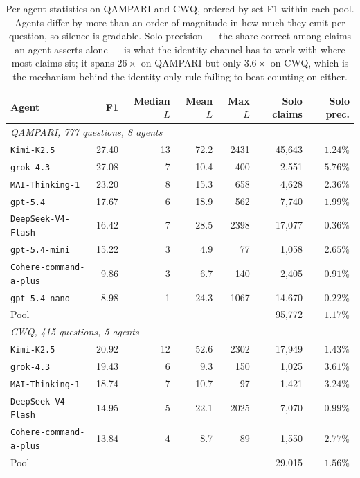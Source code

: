 \documentclass[11pt]{article}
\begin{document}
\begin{table}[t]
  \caption{Per-agent statistics on QAMPARI and CWQ, ordered by set F1 within each pool. Agents differ by more than an order of magnitude in how much they emit per question, so silence is gradable. Solo precision --- the share correct among claims an agent asserts alone --- is what the identity channel has to work with where most claims sit; it spans $26\times$ on QAMPARI but only $3.6\times$ on CWQ, which is the mechanism behind the identity-only rule failing to beat counting on either.}
  \label{tab:lengths}
  \centering
  \begin{tabular}{lrrrrrr}
    \toprule
    Agent & F1 & Median $L$ & Mean $L$ & Max $L$ & Solo claims & Solo prec. \\
    \midrule
    \multicolumn{7}{l}{\emph{QAMPARI, 777 questions, 8 agents}} \\
    \texttt{Kimi-K2.5}             & 27.40 & 13 & 72.2 & 2431 & 45,643 & $1.24\%$ \\
    \texttt{grok-4.3}              & 27.08 &  7 & 10.4 &  400 &  2,551 & $\mathbf{5.76\%}$ \\
    \texttt{MAI-Thinking-1}        & 23.20 &  8 & 15.3 &  658 &  4,628 & $2.36\%$ \\
    \texttt{gpt-5.4}               & 17.67 &  6 & 18.9 &  562 &  7,740 & $1.99\%$ \\
    \texttt{DeepSeek-V4-Flash}     & 16.42 &  7 & 28.5 & 2398 & 17,077 & $0.36\%$ \\
    \texttt{gpt-5.4-mini}          & 15.22 &  3 &  4.9 &   77 &  1,058 & $2.65\%$ \\
    \texttt{Cohere-command-a-plus} &  9.86 &  3 &  6.7 &  140 &  2,405 & $0.91\%$ \\
    \texttt{gpt-5.4-nano}          &  8.98 &  1 & 24.3 & 1067 & 14,670 & $0.22\%$ \\
    \midrule
    Pool                           &       &    &      &      & 95,772 & $1.17\%$ \\
    \midrule
    \multicolumn{7}{l}{\emph{CWQ, 415 questions, 5 agents}} \\
    \texttt{Kimi-K2.5}             & 20.92 & 12 & 52.6 & 2302 & 17,949 & $1.43\%$ \\
    \texttt{grok-4.3}              & 19.43 &  6 &  9.3 &  150 &  1,025 & $\mathbf{3.61\%}$ \\
    \texttt{MAI-Thinking-1}        & 18.74 &  7 & 10.7 &   97 &  1,421 & $3.24\%$ \\
    \texttt{DeepSeek-V4-Flash}     & 14.95 &  5 & 22.1 & 2025 &  7,070 & $0.99\%$ \\
    \texttt{Cohere-command-a-plus} & 13.84 &  4 &  8.7 &   89 &  1,550 & $2.77\%$ \\
    \midrule
    Pool                           &       &    &      &      & 29,015 & $1.56\%$ \\
    \bottomrule
  \end{tabular}
\end{table}
\end{document}
